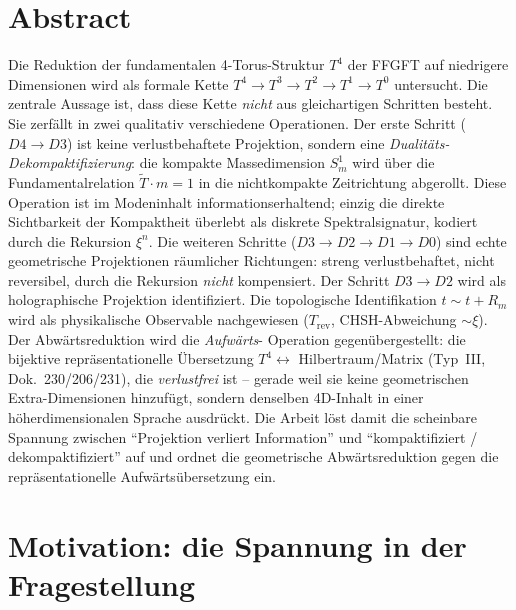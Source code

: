 
\section*{Abstract}
Die Reduktion der fundamentalen 4-Torus-Struktur $T^4$ der FFGFT auf niedrigere
Dimensionen wird als formale Kette $T^4 \to T^3 \to T^2 \to T^1 \to T^0$
untersucht. Die zentrale Aussage ist, dass diese Kette \emph{nicht} aus
gleichartigen Schritten besteht. Sie zerf\"allt in zwei qualitativ verschiedene
Operationen. Der erste Schritt ($D4\!\to\!D3$) ist keine verlustbehaftete
Projektion, sondern eine \emph{Dualit\"ats-Dekompaktifizierung}: die kompakte
Massedimension $S^1_m$ wird \"uber die Fundamentalrelation $\tilde{T}\cdot m = 1$
in die nichtkompakte Zeitrichtung abgerollt. Diese Operation ist im Modeninhalt
informationserhaltend; einzig die direkte Sichtbarkeit der Kompaktheit
\"uberlebt als diskrete Spektralsignatur, kodiert durch die Rekursion $\xi^n$.
Die weiteren Schritte ($D3\!\to\!D2\!\to\!D1\!\to\!D0$) sind echte geometrische
Projektionen r\"aumlicher Richtungen: streng verlustbehaftet, nicht reversibel,
durch die Rekursion \emph{nicht} kompensiert. Der Schritt $D3\!\to\!D2$ wird als
holographische Projektion identifiziert. Die topologische Identifikation
$t\sim t+R_m$ wird als physikalische Observable nachgewiesen ($T_\text{rev}$,
CHSH-Abweichung $\sim\xi$). Der Abw\"artsreduktion wird die \emph{Aufw\"arts}-
Operation gegen\"ubergestellt: die bijektive repr\"asentationelle \"Ubersetzung
$T^4 \leftrightarrow$ Hilbertraum/Matrix (Typ~III, Dok.~230/206/231), die
\emph{verlustfrei} ist -- gerade weil sie keine geometrischen Extra-Dimensionen
hinzuf\"ugt, sondern denselben 4D-Inhalt in einer h\"oherdimensionalen Sprache
ausdr\"uckt. Die Arbeit l\"ost damit die scheinbare Spannung zwischen
``Projektion verliert Information'' und ``kompaktifiziert / dekompaktifiziert''
auf und ordnet die geometrische Abw\"artsreduktion gegen die repr\"asentationelle
Aufw\"arts\"ubersetzung ein.



\section{Motivation: die Spannung in der Fragestellung}

